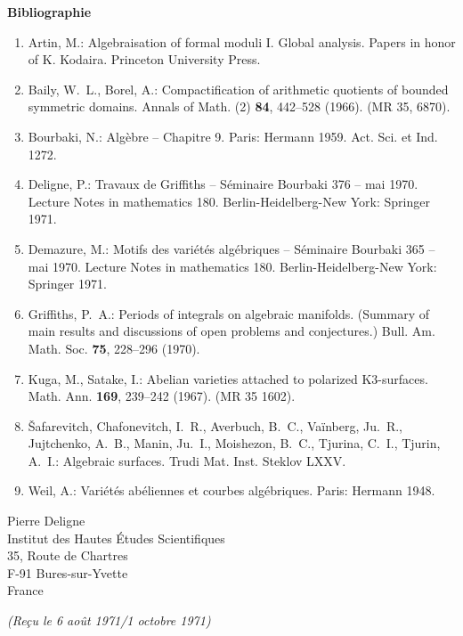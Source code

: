 \documentclass[10pt,leqno]{article}
\begin{document}
\begin{center}
\bfseries Bibliographie
\end{center}
\begin{enumerate}[label=\arabic*.]
\item Artin, M.: Algebraisation of formal moduli I. Global analysis. Papers in honor of K. Kodaira. Princeton University Press.
\item Baily, W.~L., Borel, A.: Compactification of arithmetic quotients of bounded symmetric domains. Annals of Math. (2) \textbf{84}, 442--528 (1966). (MR 35, 6870).
\item Bourbaki, N.: Algèbre -- Chapitre 9. Paris: Hermann 1959. Act. Sci. et Ind. 1272.
\item Deligne, P.: Travaux de Griffiths -- Séminaire Bourbaki 376 -- mai 1970. Lecture Notes in mathematics 180. Berlin-Heidelberg-New York: Springer 1971.
\item Demazure, M.: Motifs des variétés algébriques -- Séminaire Bourbaki 365 -- mai 1970. Lecture Notes in mathematics 180. Berlin-Heidelberg-New York: Springer 1971.
\item Griffiths, P.~A.: Periods of integrals on algebraic manifolds. (Summary of main results and discussions of open problems and conjectures.) Bull. Am. Math. Soc. \textbf{75}, 228--296 (1970).
\item Kuga, M., Satake, I.: Abelian varieties attached to polarized K3-surfaces. Math. Ann. \textbf{169}, 239--242 (1967). (MR 35 1602).
\item \v{S}afarevitch, Chafonevitch, I.~R., Averbuch, B.~C., Va\"inberg, Ju.~R., Jujtchenko, A.~B., Manin, Ju.~I., Moishezon, B.~C., Tjurina, C.~I., Tjurin, A.~I.: Algebraic surfaces. Trudi Mat. Inst. Steklov LXXV.
\item Weil, A.: Variétés abéliennes et courbes algébriques. Paris: Hermann 1948.
\end{enumerate}

\begin{flushright}
Pierre Deligne\\
Institut des Hautes Études Scientifiques\\
35, Route de Chartres\\
F-91 Bures-sur-Yvette\\
France
\end{flushright}

\begin{center}
\emph{(Reçu le 6 août 1971/1 octobre 1971)}
\end{center}
\end{document}
